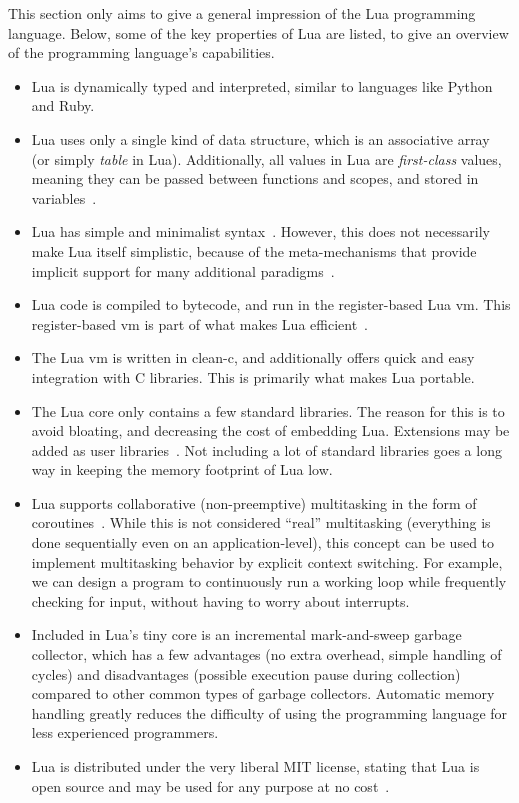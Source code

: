 \noindent
This section only aims to give a general impression of the Lua programming language.  Below, some of the key properties of Lua are listed, to give an overview of the programming language's capabilities.
\begin{itemize}
	\item Lua is dynamically typed and interpreted, similar to languages like Python and Ruby.
	\item Lua uses only a single kind of data structure, which is an associative array (or simply \emph{table} in Lua). Additionally, all values in Lua are \emph{first-class} values, meaning they can be passed between functions and scopes, and stored in variables~\cite[ch. 2.2]{manual:lua_reference_manual}.
	\item Lua has simple and minimalist syntax~\cite[ch. 9]{manual:lua_reference_manual}. However, this does not necessarily make Lua itself simplistic, because of the meta-mechanisms that provide implicit support for many additional paradigms~\cite[ch. 2.8]{manual:lua_reference_manual}.
	\item Lua code is compiled to bytecode, and run in the register-based Lua \gls{vm}. This register-based \gls{vm} is part of what makes Lua efficient~\cite{article:the_implementation_of_lua}.
	\item The Lua \gls{vm} is written in \gls{clean-c}, and additionally offers quick and easy integration with C libraries. This is primarily what makes Lua portable.
	\item The Lua core only contains a few standard libraries. The reason for this is to avoid bloating, and decreasing the cost of embedding Lua. Extensions may be added as user libraries~\cite{article:the_implementation_of_lua}. Not including a lot of standard libraries goes a long way in keeping the memory footprint of Lua low.
	\item Lua supports collaborative (non-preemptive) multitasking in the form of coroutines~\cite[ch. 2.6]{manual:lua_reference_manual}. While this is not considered ``real'' multitasking (everything is done sequentially even on an application-level), this concept can be used to implement multitasking behavior by explicit context switching. For example, we can design a program to continuously run a working loop while frequently checking for input, without having to worry about interrupts. 
	\item Included in Lua's tiny core is an incremental mark-and-sweep garbage collector, which has a few advantages (no extra overhead, simple handling of cycles) and disadvantages (possible execution pause during collection) compared to other common types of garbage collectors. Automatic memory handling greatly reduces the difficulty of using the programming language for less experienced programmers.
	\item Lua is distributed under the very liberal MIT license, stating that Lua is open source and may be used for any purpose at no cost~\cite{website:lua_license}.
\end{itemize}

